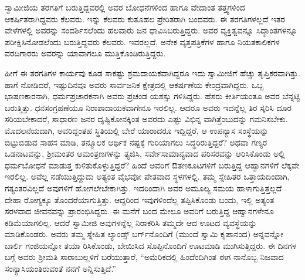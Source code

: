 ಸ್ವಾಮೀಜಿಯ ತರಗತಿಗೆ ಬರುತ್ತಿದ್ದವರಲ್ಲಿ ಅವರ ಬೋಧನೆಗಳಿಂದ ಹಾಗೂ ವೇದಾಂತ ತತ್ತ್ವಗಳಿಂದ ಆಕರ್ಷಿತರಾಗಿದ್ದವರು ಕೆಲವರು. ಇನ್ನು ಕೆಲವರು ಕುತೂಹಲ ಪ್ರೇರಿತರಾಗಿ ಬಂದವರು. ಈ ತರಗತಿಗಳಲ್ಲದೆ ಇತರ ವೇಳೆಗಳಲ್ಲಿ ಅವರನ್ನು ಸಂದರ್ಶಿಸಲೆಂದು ಹಲವಾರು ಜನ ಧಾವಿಸಿಬರುತ್ತಿದ್ದರು. ಅವರ ವ್ಯಕ್ತಿತ್ವವನ್ನೂ ಸಿದ್ಧಾಂತಗಳನ್ನೂ ಪರೀಕ್ಷಿಸಿನೋಡಲೆಂದು ಬರುತ್ತಿದ್ದವರು ಕೆಲವರು. ಇವರಲ್ಲದೆ, ಅನೇಕ ವೃತ್ತಪತ್ರಿಕೆಗಳ ಹಾಗೂ ನಿಯತಕಾಲಿಕಗಳ ವರದಿಗಾರರು ಅವರನ್ನು ಯಾವಾಗಲೂ ಮುತ್ತಿಕೊಂಡಿರುತ್ತಿದ್ದರು.

ಹೀಗೆ ಈ ತರಗತಿಗಳ ಕಾರ್ಯವು ಕೂಡ ಸಾಕಷ್ಟು ಶ್ರಮದಾಯಕವಾಗಿದ್ದರೂ ಇದು ಸ್ವಾಮೀಜಿಗೆ ಹೆಚ್ಚು ತೃಪ್ತಿಕರವಾಗಿತ್ತು. ಹಾಗೆ ನೋಡಿದರೆ, ಇಷ್ಟುದಿನವೂ ಅವರು ಸಾರ್ವಜನಿಕ ಕ್ಷೇತ್ರದಲ್ಲಿ ಆಕರ್ಷಣೆಯ ಕೇಂದ್ರವಾಗಿದ್ದರು. ಒಬ್ಬ ಭಾಷಣಕಾರನಾಗಿ, ಧರ್ಮಪ್ರಚಾರಕನಾಗಿ ಅವರು ಪ್ರಚಂಡ ಯಶಸ್ಸು ಗಳಿಸಿದ್ದರು. ಹೆಸರು ಕೀರ್ತಿಯಂತೂ ಅವರ ಬೆನ್ನಟ್ಟಿ ಬರುತ್ತಿತ್ತು. ಧನಸಂಗ್ರಹಣೆಯೂ ನಿರಾಶಾದಾಯಕವಾಗೇನೂ ಇರಲಿಲ್ಲ. ಆದರೂ ಅವರು ಇದನ್ನೆಲ್ಲ ತಿರ ಸ್ಕರಿಸಿ ದೂರ ಸರಿಯಬೇಕಾದರೆ, ಸಾಧಾರಣ ಜನರ ದೃಷ್ಟಿಕೋನಕ್ಕಿಂತ ಅವರದು ಎಷ್ಟು ವಿಭಿನ್ನ ವಾಗಿತ್ತೆಂಬುದನ್ನು ಗಮನಿಸಬೇಕು. ಮೊದಲನೆಯದಾಗಿ, ಅವರಿದ್ದಂತಹ ಸ್ಥಿತಿಯಲ್ಲಿ ಬೇರೆ ಯಾರಾದರೂ ಇದ್ದಿದ್ದರೆ, ಆ ಉಪನ್ಯಾಸ ಸಂಸ್ಥೆಯನ್ನು ಬಿಟ್ಟುಬಿಡುವ ಸಾಹಸ ಮಾಡಿ, ತನ್ಮೂಲಕ ಆರ್ಥಿಕ ನಷ್ಟಕ್ಕೆ ಗುರಿಯಾಗಲು ಸಿದ್ಧರಿರುತ್ತಿದ್ದರೆ? ಅಥವಾ ಗಣ್ಯರ ಒಡನಾಟವನ್ನು, ಶ್ರೀಮಂತರ ಆಮಂತ್ರಣಗಳನ್ನು ತ್ಯಜಿಸಿ, ಸರ್ವೇಸಾಮಾನ್ಯವಾದ ಪರಿಸರವನ್ನು ಆರಿಸಿಕೊಂಡು ಅಲ್ಲಿ ಧರ್ಮಬೋಧನೆ ಮಾಡುತ್ತ ಕುಳಿತುಕೊಳ್ಳುತ್ತಿದ್ದರೆ? ಹಿಂದೆ ಅವರಿಗೆ ಔತಣಕೂಟಗಳಿಗೆ ಬರುತ್ತಿದ್ದ ಆಹ್ವಾನಗಳಿಗೆ ಲೆಕ್ಕವೇ ಇರಲಿಲ್ಲ. ಅವೆಲ್ಲ ನಡೆಯುತ್ತಿದ್ದುದು ಅತ್ಯಂತ ವೈಭವೋ ಪೇತವಾದ ಸ್ಥಳಗಳಲ್ಲಿ. ತಮ್ಮ ಸ್ನೇಹಿತರ ಒತ್ತಾಯದಿಂದಾಗಿ, ಗತ್ಯಂತರವಿಲ್ಲದೆ ಅವುಗಳಿಗೆ ಹೋಗಲೇಬೇಕಾಗಿತ್ತು. ಇದರಿಂದಾಗಿ ಅವರ ಅಮೂಲ್ಯ ಸಮಯ ಹಾಳಾಗುತ್ತಿತ್ತಲ್ಲದೆ ದೇಹಾ ರೋಗ್ಯಕ್ಕೂ ತೊಂದರೆಯಾಗುತ್ತಿತ್ತು. ಆದ್ದರಿಂದ ಇವುಗಳಿಂದೆಲ್ಲ ತಪ್ಪಿಸಿಕೊಂಡು ಬಂದು, ಇಲ್ಲಿ ಅತ್ಯಂತ ಸರಳವಾದ ಜೀವನವನ್ನು ಪ್ರಾರಂಭಿಸಿದ್ದರು. ಈ ಮನೆಗೆ ಬಂದ ಮೇಲೂ ಅವರಿಗೆ ಬರುತ್ತಿದ್ದ ಆಹ್ವಾನಗಳೇನೂ ಕಡಿಮೆಯಾಗಲಿಲ್ಲ. ಆದರೆ ಸ್ವಾಮೀಜಿ ಅವುಗಳನ್ನೆಲ್ಲ ನಿರಾಕರಿಸಿ ತಮ್ಮದೇ ಆದ ಊಟದ ವ್ಯವಸ್ಥೆಯನ್ನು ಮಾಡಿಕೊಂಡರು. ಅವರು ತಮ್ಮ ಸ್ನೇಹಿತ ಲ್ಯಾಂಡ್ಸ್ ಬರ್ಗ್​ನೊಂದಿಗೆ (ಮುಂದೆ ಸ್ವಾಮಿ ಕೃಪಾನಂದ) ಅನ್ನವನ್ನೋ ಬಾರ್ಲಿ ಗಂಜಿಯನ್ನೋ ತಯಾ ರಿಸಿಕೊಂಡು, ಬೇಯಿಸಿದ ಸೊಪ್ಪಿನೊಂದಿಗೆ ಊಟಮಾಡಿ ಮುಗಿಸುತ್ತಿದ್ದರು. ಈ ದಿನಗಳ ಬಗ್ಗೆ ಅವರು ಶ್ರೀಮತಿ ಸಾರಾಬುಲ್ಲಳಿಗೆ ಬರೆಯುತ್ತಾರೆ, “ಅಮೆರಿಕದಲ್ಲಿ ಹಿಂದೆಂದಿಗಿಂತ ಈಗ ನಾನೊಬ್ಬ ನಿಜವಾದ ಸಂನ್ಯಾಸಿಯಂತಿರುವಂತೆ ನನಗೆ ಅನ್ನಿಸುತ್ತಿದೆ.”

